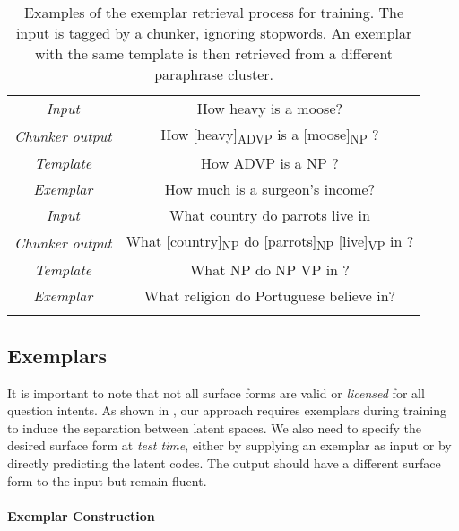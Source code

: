 \documentclass[11pt,a4paper]{article}
\begin{document}
\begin{table}[t!]
    \small
    \centering
    \begin{tabular}{@{}c@{~}|@{~}c@{}}
    
    \hhline{==}
        \textit{Input} & How heavy is a moose? \\
\textit{Chunker output} & How [heavy]\textsubscript{ADVP} is a [moose]\textsubscript{NP} ? \\
\textit{Template} & How ADVP is a NP ? \\
\textit{Exemplar} & How much is a surgeon's income? \\
    \hhline{==}
        \textit{Input} & What country do parrots live in \\
\textit{Chunker output} & What [country]\textsubscript{NP} do  [parrots]\textsubscript{NP} [live]\textsubscript{VP} in ? \\
\textit{Template} & What NP do NP VP in ? \\
\textit{Exemplar} & What religion do Portuguese believe in? \\
     \hhline{==}
    \end{tabular}
\vspace*{-.1cm}
    \caption{Examples of the exemplar retrieval process for training. The input is tagged by a chunker, ignoring stopwords. An exemplar with the same template is then retrieved from a different paraphrase cluster.}
    \label{tab:templateexample}
\end{table}


\subsection{Exemplars}
\label{sec:exemplars}

It is important to note that not all surface forms are valid or
\textit{licensed} for all question intents. As shown in
, our approach requires exemplars during training
to induce the separation between latent spaces.  We also need to
specify the desired surface form at \textit{test time}, either by
supplying an exemplar as input or by directly predicting the latent
codes. The output should have a different surface form to the input
but remain fluent.

\paragraph{Exemplar Construction}
\end{document}
